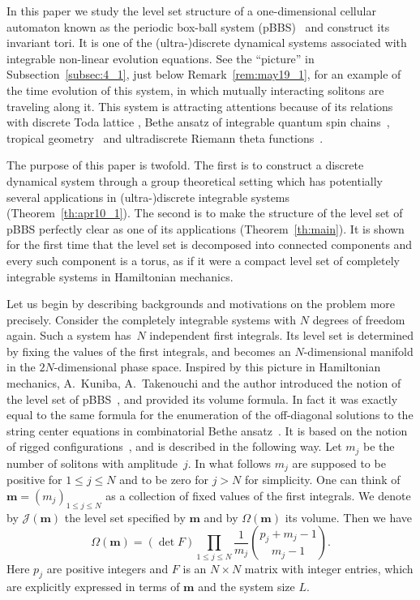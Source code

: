 \documentclass[pdftex]{sigma}
\newcommand{\J}{{\mathcal J}}
\newcommand{\m}{{\boldsymbol m}}
\begin{document}
In this paper we study the level set structure of a one-dimensional cellular automaton known as
the periodic box-ball system (pBBS)~\cite{YT, YYT} and construct its invariant tori.
It is {one of the} (ultra-)discrete dynamical systems associated with
integrable non-linear evolution equations.
See the ``picture''
in Subsection~\ref{subsec:4_1}, just below Remark~\ref{rem:may19_1}, for an example of the time evolution of this system, in which
mutually interacting solitons are traveling along it.
This system is attracting attentions because of its relations with discrete Toda lattice \cite{IT},
Bethe ansatz of integrable quantum spin chains~\cite{KTT}, tropical geometry~\cite{InT} and ultradiscrete
Riemann theta functions~\cite{KS1}.

The purpose of this paper is twofold.
The f\/irst is to construct
a discrete dynamical system through a group theoretical setting
which has potentially several applications in (ultra-)discrete integrable systems (Theorem~\ref{th:apr10_1}).
The second is
to make the structure of the level set of pBBS
perfectly clear as one of its applications (Theorem~\ref{th:main}).
It is shown for the f\/irst time that the level set is decomposed into connected components and every such component is a torus,
as if it were a compact level set of completely integrable systems in Hamiltonian mechanics.

Let us begin by describing backgrounds and motivations on the problem more precisely.
Consider
the completely integrable systems with $N$ degrees of freedom again.
Such a system has~$N$ independent f\/irst integrals.
Its level set is determined by f\/ixing the values of the f\/irst integrals, and becomes
an $N$-dimensional manifold in the $2N$-dimensional phase space.
Inspired by this picture in Hamiltonian mechanics,
A.~Kuniba, A.~Takenouchi and the author
introduced the notion of the level set of pBBS~\cite{KTT}, and
provided its volume formula.
In fact it was exactly equal to the same formula
for the enumeration of the of\/f-diagonal solutions to the string center equations in combinatorial
Bethe ansatz~\cite{KN}.
It is based on the notion of rigged conf\/igurations~\mbox{\cite{KKR,KR}}, and is described in the following way.
Let $m_j$ be the number of solitons with amplitude~$j$.
In what follows $m_j$ are supposed to be positive for $1 \leq j \leq N$ and to be zero for $j > N$ for simplicity.
One can think of $\m=(m_j)_{1 \leq j \leq N}$ as a collection of f\/ixed values of the f\/irst integrals.
We denote by $\J (\m)$ the level set specif\/ied by $\m$
and by $\Omega(\m)$
its volume.
Then we have \cite{KTT}
\begin{equation}
\Omega(\m) =
(\det F)\prod_{1 \leq j \leq N} \frac{1}{m_j}
\binom{p_j + m_j - 1}{m_j - 1}.\label{eq:oct10_1}
\end{equation}
Here $p_j$ are positive integers and $F$ is an $N \times N$ matrix with integer entries,
which are explicitly expressed in terms of $\m$ and the system size $L$.
\end{document}
